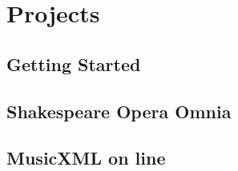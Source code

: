 \documentclass[a4paper, notitlepage]{article}
\begin{document}
\section{Projects}

\subsection{Getting Started}

\subsection{Shakespeare Opera Omnia}

\subsection{MusicXML on line}
\end{document}
